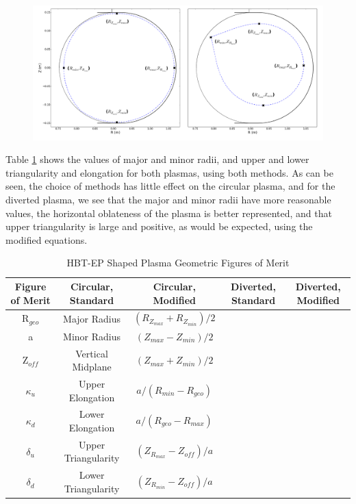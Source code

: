 \begin{figure}
\includegraphics[width = \textwidth]{./figures/Circular_and_diverted_shape_for_elong_triang.png}\begin{flushleft}
\caption{}
\end{flushleft}
\label{new_limiters}
\end{figure}

Table \ref{Shaping_params_C_and_D} shows the values of major and minor radii, and upper and lower triangularity and elongation for both plasmas, using both methods. As can be seen, the choice of methods has little effect on the circular plasma, and for the diverted plasma, we see that the major and minor radii have more reasonable values, the horizontal oblateness of the plasma is better represented, and that upper triangularity is large and positive, as would be expected, using the modified equations.


\begin{table}[h!]
\centering
\begin{tabular}{ |c|c|c|c|c| } 
\hline
\textbf{Figure of Merit}&\textbf{Circular, Standard} & \textbf{Circular, Modified} & \textbf{Diverted, Standard} &\textbf{Diverted, Modified} \\ 
\hline
R$_{geo}$ & Major Radius & $(R_{Z_{max}}+R_{Z_{min}})/2$ \\
\hline
a & Minor Radius & $(Z_{max}-Z_{min})/2$ \\ 
\hline
Z$_{off}$ & Vertical Midplane & $(Z_{max}+Z_{min})/2$ \\ 
\hline
$\kappa_u$ & Upper Elongation & $a/(R_{min}-R_{geo})$ \\ 
\hline
$\kappa_d$ & Lower Elongation & $a/(R_{geo}-R_{max})$ \\ 
\hline
$\delta_u$ & Upper Triangularity & $(Z_{R_{max}} - Z_{off})/a$ \\ 
\hline
$\delta_d$ & Lower Triangularity & $(Z_{R_{min}}-Z_{off})/a$ \\ 
\hline
\end{tabular}
\caption{HBT-EP Shaped Plasma Geometric Figures of Merit}
\label{Shaping_params_C_and_D}
\end{table}